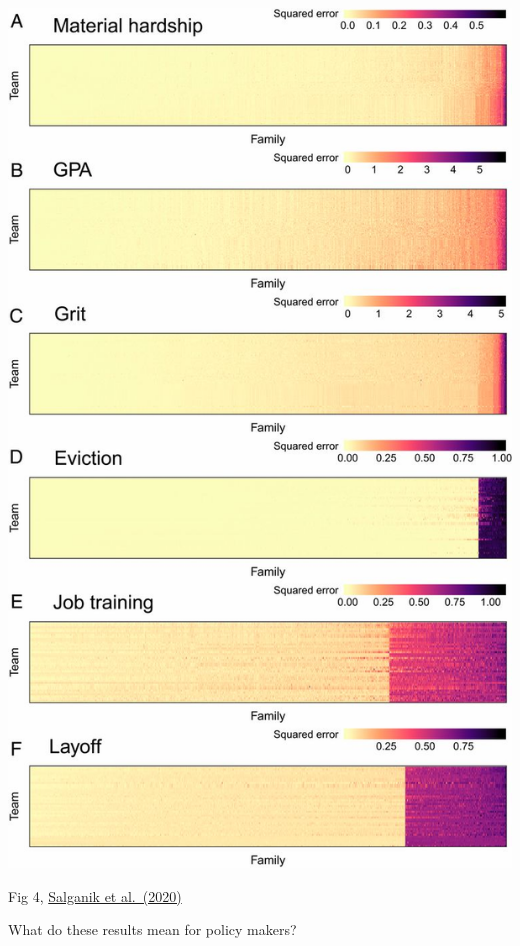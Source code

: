 \documentclass[aspectratio=169]{beamer}
\begin{document}
\begin{frame}


\begin{center}
\includegraphics[height=0.90\textheight]{figures/salganik_measuring_2020_fig4}
\end{center}

\vfill
Fig 4, \href{https://doi.org/10.1073/pnas.1915006117}{Salganik et al.\ (2020)}
\end{frame}
\begin{frame}

\begin{center}
\Large{What do these results mean for policy makers?}
\end{center}

\end{frame}
\end{document}
